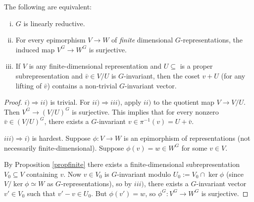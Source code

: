 \documentclass[11pt, english]{article}
\begin{document}
\begin{prop}
\label{proplinred}
The following are equivalent:
\begin{enumerate}[i)]
\item $G$ is linearly reductive.
\item For every epimorphism $V \to W$  of \emph{finite} dimensional $G$-representations, the induced map $V^G \to W^G$ is surjective.
\item If $V$ is any finite-dimensional representation and $U \subseteq$ is a proper subrepresentation and $\bar v \in V/U$ is $G$-invariant, then the coset $v + U$ (for any lifting of $\bar v$) contains a non-trivial $G$-invariant vector.
\end{enumerate}
\end{prop}
\begin{proof}
$i) \Rightarrow ii)$ is trivial. For $ii) \Rightarrow iii)$, apply $ii)$ to the quotient map $V \to V/U$. Then $V^G \to (V/U)^G$ is surjective. This implies that for every nonzero $\bar v \in (V/U)^G$, there exists a $G$-invariant $v \in \pi^{-1}(v)=U+\bar v$.

$iii) \Rightarrow i)$ is hardest. Suppose $\phi:V \to W$ is an epimorphism of representations (not necessarily finite-dimensional). Suppose $\phi(v)=w \in W^G$ for some $v \in V$.

By Proposition \ref{propfinite} there exists a finite-dimensional subrepresentation $V_0 \subseteq V$ containing $v$. Now $v \in V_0$ is $G$-invariant modulo $U_0 := V_0 \cap \ker \phi$ (since $V/\ker \phi \simeq W$ as $G$-representations), so by $iii)$, there exists a $G$-invariant vector $v' \in V_0$ such that $v'-v \in U_0$. But $\phi(v')=w$, so $\phi^G:V^G \to W^G$ is surjective.
\end{proof}
\end{document}
